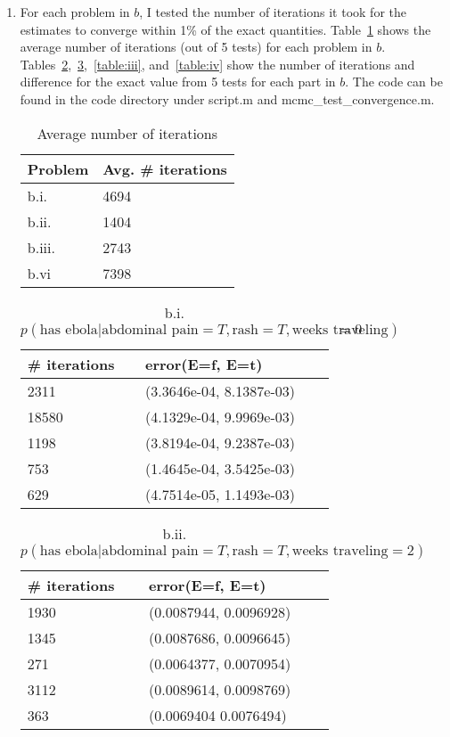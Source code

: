 \documentclass{article}
\begin{document}
\begin{enumerate}[label=(d)]

\item 
For each problem in $b$, I tested the number of iterations it took for the estimates to converge within 1\% of the exact quantities.
Table~\ref{table:avgs} shows the average number of iterations (out of 5 tests) for each problem in $b$.
Tables~\ref{table:i},~\ref{table:ii},~\ref{table:iii}, and~\ref{table:iv} show the number of iterations and difference
for the exact value from 5 tests for each part in $b$. The code can be found in the code directory under script.m
and mcmc\_test\_convergence.m.

\begin{table}[h]
\centering
\caption{Average number of iterations}
\label{table:avgs}
\begin{tabular}{|l|l|}
\hline
 Problem  & Avg. \# iterations   \\
\hline \hline
b.i. & 4694 \\
b.ii. & 1404 \\
b.iii. & 2743 \\
b.vi & 7398 \\
\hline
\end{tabular}
\end{table}

\begin{table}[h]
\centering
\caption{b.i. $p(\text{has ebola}|\text{abdominal pain}=T, \text{rash}=T, \text{weeks traveling})=0$}
\label{table:i}
\begin{tabular}{|l|l|}
\hline
 \# iterations  & error(E=f, E=t)   \\
\hline \hline
2311 & (3.3646e-04, 8.1387e-03) \\
18580 & (4.1329e-04, 9.9969e-03) \\
1198 & (3.8194e-04, 9.2387e-03) \\
753 & (1.4645e-04, 3.5425e-03) \\
629 & (4.7514e-05, 1.1493e-03) \\
\hline
\end{tabular}
\end{table}

\begin{table}[h]
\centering
\caption{b.ii. $p(\text{has ebola}|\text{abdominal pain}=T, \text{rash}=T, \text{weeks traveling}=2)$}
\label{table:ii}
\begin{tabular}{|l|l|}
\hline
 \# iterations  & error(E=f, E=t)   \\
\hline \hline
1930 & (0.0087944, 0.0096928) \\
1345 & (0.0087686, 0.0096645) \\
271 & (0.0064377, 0.0070954) \\
3112 & (0.0089614, 0.0098769) \\
363 & (0.0069404   0.0076494) \\
\hline
\end{tabular}
\end{table}


\end{enumerate}
\end{document}
